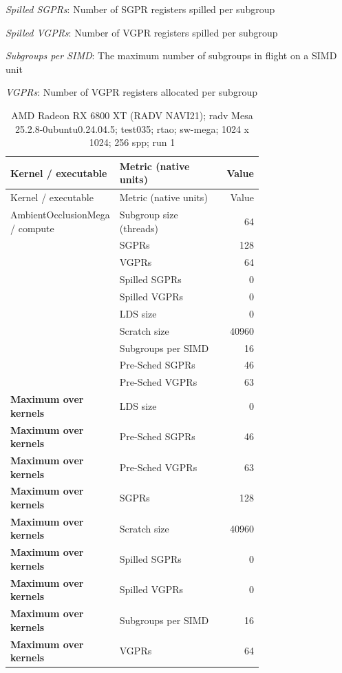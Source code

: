 \noindent\textit{Spilled SGPRs}: Number of SGPR registers spilled per subgroup\par
\noindent\textit{Spilled VGPRs}: Number of VGPR registers spilled per subgroup\par
\noindent\textit{Subgroups per SIMD}: The maximum number of subgroups in flight on a SIMD unit\par
\noindent\textit{VGPRs}: Number of VGPR registers allocated per subgroup\par
\begin{longtable}{p{0.30\linewidth}p{0.43\linewidth}r}
\caption{AMD Radeon RX 6800 XT (RADV NAVI21); radv Mesa 25.2.8-0ubuntu0.24.04.5; test035; rtao; sw-mega; 1024 x 1024; 256 spp; run 1}\label{tab:hydra-profile-28}\\
\hline Kernel / executable & Metric (native units) & Value \\\hline
\endfirsthead
\hline Kernel / executable & Metric (native units) & Value \\\hline
\endhead
AmbientOcclusionMega / compute & Subgroup size (threads) & 64 \\
 & SGPRs & 128 \\
 & VGPRs & 64 \\
 & Spilled SGPRs & 0 \\
 & Spilled VGPRs & 0 \\
 & LDS size & 0 \\
 & Scratch size & 40960 \\
 & Subgroups per SIMD & 16 \\
 & Pre-Sched SGPRs & 46 \\
 & Pre-Sched VGPRs & 63 \\
\hline
\textbf{Maximum over kernels} & LDS size & 0 \\
\textbf{Maximum over kernels} & Pre-Sched SGPRs & 46 \\
\textbf{Maximum over kernels} & Pre-Sched VGPRs & 63 \\
\textbf{Maximum over kernels} & SGPRs & 128 \\
\textbf{Maximum over kernels} & Scratch size & 40960 \\
\textbf{Maximum over kernels} & Spilled SGPRs & 0 \\
\textbf{Maximum over kernels} & Spilled VGPRs & 0 \\
\textbf{Maximum over kernels} & Subgroups per SIMD & 16 \\
\textbf{Maximum over kernels} & VGPRs & 64 \\
\hline
\end{longtable}
